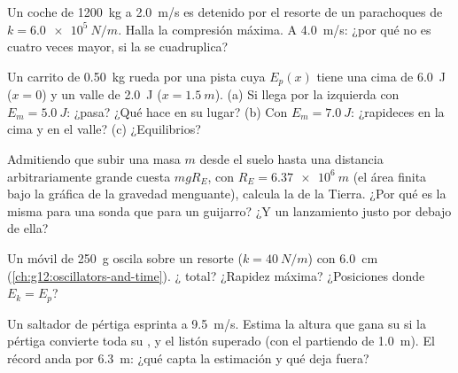 \begin{exercise}[$\star\star$]\label{exo:g12:work-and-energy:11}
Un coche de \qty{1200}{kg} a \qty{2.0}{m/s} es detenido por el resorte de un parachoques
de  $k = \qty{6.0e5}{N/m}$. Halla la compresión máxima. A
\qty{4.0}{m/s}: ¿por qué no es cuatro veces mayor, si la  se cuadruplica?
\end{exercise}

\begin{exercise}[$\star\star\star$]\label{exo:g12:work-and-energy:12}
Un carrito de \qty{0.50}{kg} rueda por una pista cuya $E_p(x)$ tiene una cima de
\qty{6.0}{J} ($x = 0$) y un valle de \qty{2.0}{J} ($x = \qty{1.5}{m}$). (a) Si llega
por la izquierda con $E_m = \qty{5.0}{J}$: ¿pasa? ¿Qué hace en su lugar? (b) Con
$E_m = \qty{7.0}{J}$: ¿rapideces en la cima y en el valle? (c) ¿Equilibrios?
\end{exercise}

\begin{exercise}[$\star\star\star$]\label{exo:g12:work-and-energy:13}
Admitiendo que subir una masa $m$ desde el suelo hasta una distancia arbitrariamente
grande cuesta $mgR_E$, con $R_E = \qty{6.37e6}{m}$ (el área finita bajo la gráfica de
la gravedad menguante), calcula la \emph{} de la Tierra. ¿Por qué
es la misma para una sonda que para un guijarro? ¿Y un lanzamiento justo por debajo de
ella?
\end{exercise}

\begin{exercise}[$\star\star\star$]\label{exo:g12:work-and-energy:14}
Un móvil de \qty{250}{g} oscila sobre un resorte ($k = \qty{40}{N/m}$) con 
\qty{6.0}{cm} (\cref{ch:g12:oscillators-and-time}). ¿ total? ¿Rapidez máxima?
¿Posiciones donde $E_k = E_p$?
\end{exercise}

\begin{exercise}[$\star\star\star$]\label{exo:g12:work-and-energy:15}
Un saltador de pértiga esprinta a \qty{9.5}{m/s}. Estima la altura que gana su  si la pértiga convierte toda su , y el listón superado (con
el  partiendo de \qty{1.0}{m}). El récord anda por \qty{6.3}{m}: ¿qué
capta la estimación y qué deja fuera?
\end{exercise}

